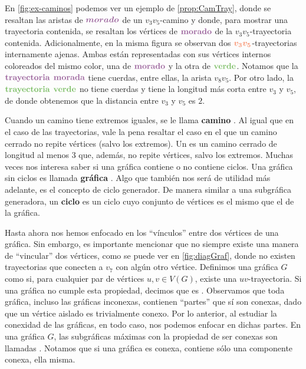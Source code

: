 En \cref{fig:ex-caminos} podemos ver un ejemplo de \cref{prop:CamTray}, donde se
resaltan las aristas de ${\color{morado}\boldsymbol {morado}}$ de un $v_3
v_5$-camino y donde, para mostrar una trayectoria contenida, se resaltan los
v\'ertices de ${\color{morado}\textbf{morado}}$ de la $v_3 v_5$-trayectoria
contenida. Adicionalmente, en la misma figura se observan dos
${\color{coral}\boldsymbol {v_3 v_5}}$-trayectorias internamente ajenas. Ambas
est\'an representadas con sus v\'ertices internos coloreados del mismo color,
una de ${\color{morado}\bf {morado}}$ y la otra de
${\color{verde}\bf {verde}}$. Notamos que la
${\color{morado}\bf{trayectoria}}$ ${\color{morado}\bf
{morada}}$ tiene cuerdas, entre ellas, la arista $v_8v_5$. Por otro lado, la
${\color{verde}\bf{trayectoria}}$ ${\color{verde}\bf {verde}}$
no tiene cuerdas y tiene la longitud m\'as corta entre $v_3$ y $v_5$, de donde
obtenemos que la distancia entre $v_3$ y $v_5$ es $2$.

Cuando un camino tiene extremos iguales, se le llama \textbf{camino}
. Al igual que en el caso de las trayectorias, vale
la pena resaltar el caso en el que un camino cerrado no repite v\'ertices (salvo
los extremos). Un  es un camino cerrado de longitud al menos $3$
que, adem\'as, no repite v\'ertices, salvo los extremos.  Muchas veces nos
interesa saber si una gr\'afica contiene o no contiene ciclos. Una gr\'afica sin
ciclos es llamada \textbf{gr\'afica} . Algo que
tambi\'en nos ser\'a de utilidad m\'as adelante, es el concepto de ciclo
generador. De manera similar a una subgr\'afica generadora, un \textbf{ciclo}
 es un ciclo cuyo conjunto de v\'ertices es el mismo
que el de la gr\'afica.
   
Hasta ahora nos hemos enfocado en los ``v\'inculos'' entre dos v\'ertices de una
gr\'afica. Sin embargo, es importante mencionar que no siempre existe una manera
de ``vincular'' dos v\'ertices, como se puede ver en \cref{fig:diagGraf}, donde
no existen trayectorias que conecten a $v_7$ con alg\'un otro v\'ertice.
Definimos una gr\'afica $G$ como
 si, para cualquier par de
v\'ertices $u,v \in V(G)$, existe una $uv$-trayectoria. Si una gr\'afica no
cumple esta propiedad, decimos que es .
Observamos que toda gr\'afica, incluso las gr\'aficas inconexas, contienen
``partes'' que s\'i son conexas, dado que un v\'ertice aislado es trivialmente
conexo. Por lo anterior, al estudiar la conexidad de las gr\'aficas, en todo
caso, nos podemos enfocar en dichas partes. En una gr\'afica $G$, las
subgr\'aficas m\'aximas con la propiedad de ser conexas son llamadas
. Notamos que si una
gr\'afica es conexa, contiene s\'olo una componente conexa, ella misma.

